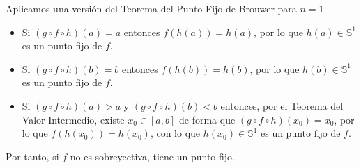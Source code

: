 \documentclass[12pt]{article}
\begin{document}
\begin{ejercicio}
\begin{enumerate}[label=\alph*)]
                Aplicamos una versión del Teorema del Punto Fijo de Brouwer para $n=1$.
                \begin{itemize}
                    \item Si $(g\circ f\circ h)(a)=a$ entonces $f(h(a)) = h(a)$, por lo que $h(a)\in \mathbb{S}^1$ es un punto fijo de $f$.
                    \item Si $(g\circ f\circ h)(b)=b$ entonces $f(h(b)) = h(b)$, por lo que $h(b)\in \mathbb{S}^1$ es un punto fijo de $f$.
                    \item Si $(g\circ f\circ h)(a)>a$ y $(g\circ f\circ h)(b)<b$ entonces, por el Teorema del Valor Intermedio, existe $x_0\in [a,b]$ de forma que $(g\circ f\circ h)(x_0) = x_0$, por lo que $f(h(x_0)) = h(x_0)$, con lo que $h(x_0)\in \mathbb{S}^1$ es un punto fijo de $f$.
                \end{itemize}

                Por tanto, si $f$ no es sobreyectiva, tiene un punto fijo.
        \end{enumerate}
    \end{ejercicio}
\end{document}
